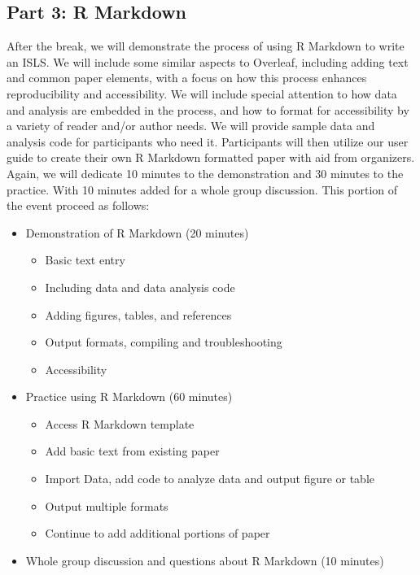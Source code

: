 \documentclass{article}
\begin{document}
\subsection{Part 3: R Markdown} 
After the break, we will demonstrate the process of using R Markdown to write an ISLS. We will include some similar aspects to Overleaf, including adding text and common paper elements, with a focus on how this process enhances reproducibility and accessibility. We will include special attention to how data and analysis are embedded in the process, and how to format for accessibility by a variety of reader and/or author needs. We will provide sample data and analysis code for participants who need it. Participants will then utilize our user guide to create their own R Markdown formatted paper with aid from organizers. Again, we will dedicate 10 minutes to the demonstration and 30 minutes to the practice. With 10 minutes added for a whole group discussion. This portion of the event proceed as follows: 
\begin{itemize}
    \item Demonstration of R Markdown (20 minutes)
    \begin{itemize}
        \item Basic text entry
        \item Including data and data analysis code
        \item Adding figures, tables, and references
        \item Output formats, compiling and troubleshooting
        \item Accessibility
    \end{itemize}
    \item Practice using R Markdown (60 minutes)
    \begin{itemize}
        \item Access R Markdown template 
        \item Add basic text from existing paper
        \item Import Data, add code to analyze data and output figure or table
        \item Output multiple formats
        \item Continue to add additional portions of paper
    \end{itemize}
    \item Whole group discussion and questions about R Markdown (10 minutes)
\end{itemize}
\end{document}
